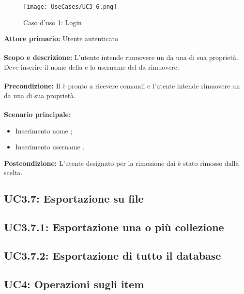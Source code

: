 \documentclass{scalatekids-article}
\begin{document}
\begin{figure}[H]
  \begin{center}
    \texttt{[image: UseCases/UC3\_6.png]}
    \caption*{Caso d'uso 1: Login}
  \end{center}
\end{figure}
\textbf{Attore primario:} Utente autenticato\\ \\
\textbf{Scopo e descrizione:} L'utente intende rimuovere un  da una  di sua proprietà. Deve inserire il nome della  e lo username del  da rimuovere.\\ \\
\textbf{Precondizione:} Il  è pronto a ricevere comandi e l'utente intende rimuovere un  da una  di sua proprietà.\\ \\
\textbf{Scenario principale:}
\begin{itemize}
\item Inserimento nome ;
\item Inserimento username .
\end{itemize}
\textbf{Postcondizione:} L'utente designato per la rimozione dai  è stato rimosso dalla  scelta.

\subsection{UC3.7: Esportazione su file}

\subsection{UC3.7.1: Esportazione una o più collezione}

\subsection{UC3.7.2: Esportazione di tutto il database}

\subsection{UC4: Operazioni sugli item}
\end{document}
